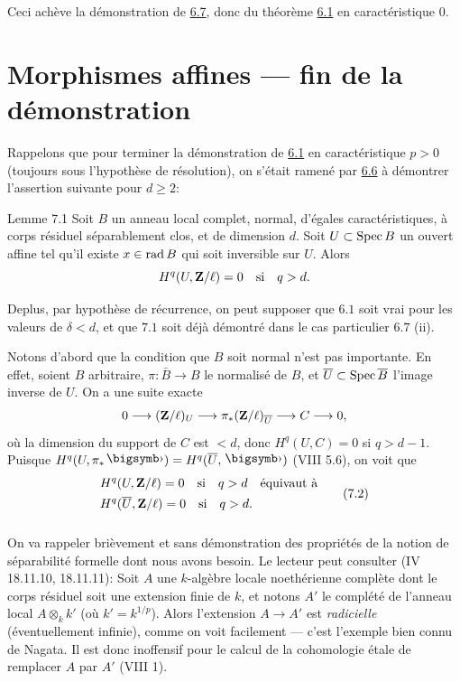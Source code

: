 \documentclass[10pt]{../fichiers-configuration-latex/smfart}
\begin{document}
Ceci achève la démonstration de \hyperref[XIX.lem6.7]{6.7}, donc du théorème \hyperref[XIX.thm6.1]{6.1} en
caractéristique 0.

\section{Morphismes affines --- fin de la démonstration}

Rappelons que pour terminer la démonstration de \hyperref[XIX.thm6.1]{6.1} en caractéristique
$p>0$ (toujours sous l'hypothèse de résolution), on s'était ramené par
\hyperref[XIX.lem6.6]{6.6} à démontrer l'assertion suivante pour $d\geq 2$:

\begin{enonce*}{Lemme 7.1}
Soit $B$ un anneau local complet, normal, d'égales caractéristiques, à
corps résiduel séparablement clos, et de dimension $d$. Soit $U\subset
\operatorname{Spec} B$ un ouvert affine tel qu'il existe $x\in \operatorname{rad} B$ qui soit
inversible sur $U$. Alors 
$$
H^{q}(U,\mathbf{Z}/\ell)=0\quad\text{\rm si}\quad q>d{}.
$$

De\pageoriginale plus, par hypothèse de récurrence, on peut supposer 
que $6.1$ soit vrai pour les valeurs de $\delta<d$, et que $7.1$ soit déjà démontré
dans le cas particulier $6.7$ {\rm (ii)}.
\end{enonce*}

Notons d'abord que la condition que $B$ soit normal n'est pas
importante. En effet, soient $B$ arbitraire, $\pi:\bar{B}\rightarrow
B$ le normalisé de $B$, et $\overline{U}\subset\operatorname{Spec} \overline{B}$ l'image
inverse de $U$. On a une suite exacte
$$
0\longrightarrow (\mathbf{Z}/\ell)_{U}\longrightarrow
\pi_{\ast}(\mathbf{Z}/\ell)_{\overline{U}}\longrightarrow C\longrightarrow
0{},
$$
où la dimension du support de $C$ est $<d$, donc $H^{q}(U,C)=0$ si
$q>d-1$. Puisque $H^{q}(U,\pi_{\ast}\bigdot)=
H^{q}(\bar{U},\bigdot)$ (VIII 5.6), on voit que
\begin{equation*}
\begin{split}
& H^{q}(U,\mathbf{Z}/\ell)=0\quad \text{\rm si}\quad q>d\quad
\text{\rm équivaut à}\\
& H^{q}(\overline{U},\mathbf{Z}/\ell)=0\quad\text{\rm si}\quad q>d{}.
\end{split}\tag{7.2}
\end{equation*}

\setcounter{subsection}{3}
\setcounter{subsubsection}{-1}
\subsubsection{}
On va rappeler brièvement et sans démonstration des propriétés de la
notion de séparabilité formelle dont nous avons besoin. Le lecteur
peut consulter (\EGA IV 18.11.10, 18.11.11): Soit $A$ une $k$-algèbre
locale noethérienne complète dont le corps résiduel soit une extension
finie de $k$, et notons $A'$ le complété de l'anneau local
$A\otimes_{k}k'$ (où $k'=k^{1/p}$). Alors l'extension $A\rightarrow
A'$ est \emph{radicielle} (éventuellement infinie), comme on voit
facilement --- c'est l'exemple bien connu de Nagata. Il est donc
inoffensif pour le calcul de la cohomologie étale de remplacer $A$ par
$A'$ (VIII 1).
\end{document}
